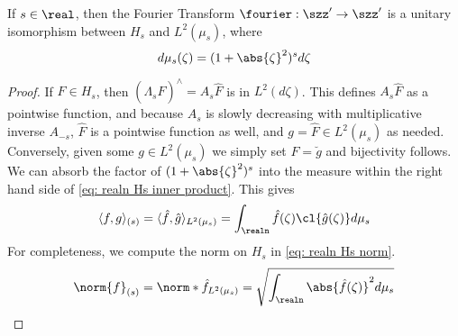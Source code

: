 \documentclass[../main-v2-manifolds.tex]{subfiles}
\begin{document}
\begin{lemma}
    If $s\in\real$, then the Fourier Transform $\fourier: \szz'\to\szz'$ is a unitary isomorphism between $H_s$ and $L^2(\mu_s)$, where 
    \[
        d\mu_s(\zeta)=(1+\abs{\zeta}^2)^{s}d\zeta
    \]
\end{lemma}
\begin{proof}
    If $F\in H_s$, then $(\Lambda_s \hat{F})^{\wedge} = A_s\hat{F}$ is in $L^2(d\zeta)$. This defines $A_s\hat{F}$ as a pointwise function, and because $A_s$ is slowly decreasing with multiplicative inverse $A_{-s}$, $\hat{F}$ is a pointwise function as well, and $g = \hat{F}\in L^2(\mu_s)$ as needed.\\

    Conversely, given some $g\in L^2(\mu_s)$ we simply set $F = \breve{g}$ and bijectivity follows. We can absorb the factor of $(1+\abs{\zeta}^2)^s$ into the measure within the right hand side of \cref{eq: realn Hs inner product}. This gives
    \begin{equation}
        \langle f,g\rangle_{(s)} = \langle \hat{f},\hat{g}\rangle_{L^2(\mu_s)}=\int_{\realn}\hat{f}(\zeta)\cl{\hat{g}(\zeta)}d\mu_s
        \label{eq: realn Hs inner product fourier trans}
    \end{equation}
    For completeness, we compute the norm on $H_s$ in \cref{eq: realn Hs norm}.
    \begin{equation}
        \norm{f}_{(s)} = \norm*{\hat{f}}_{L^2(\mu_s)}=\sqrt{\int_{\realn}\abs{\hat{f}(\zeta)}^2d\mu_s}
        \label{eq: realn Hs norm}
    \end{equation}
\end{proof}

\end{document}
